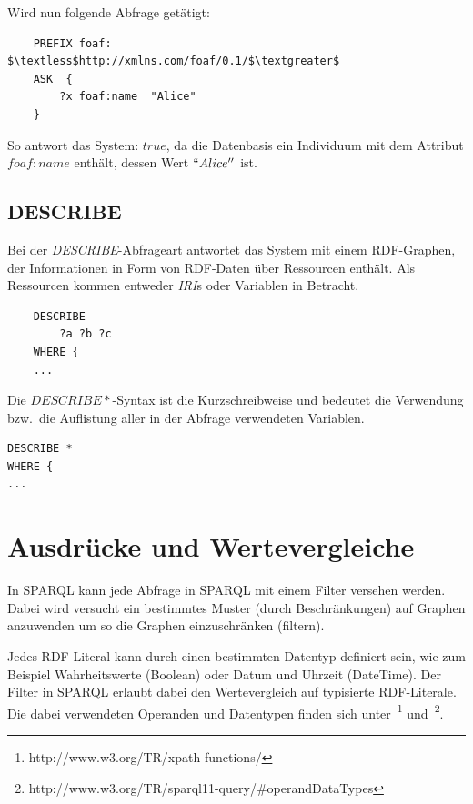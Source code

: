 Wird nun folgende Abfrage getätigt:
\lstset{language=XML}
\begin{lstlisting}
    PREFIX foaf:    $\textless$http://xmlns.com/foaf/0.1/$\textgreater$
    ASK  { 
        ?x foaf:name  "Alice"
    }
\end{lstlisting}
So antwort das System: $true$, da die Datenbasis ein Individuum mit dem Attribut $foaf:name$ enthält, dessen Wert $``Alice''$ ist.

\subsection{DESCRIBE}
\label{subsec:sparql_abfragearten_describe}
Bei der \textit{DESCRIBE}-Abfrageart antwortet das System mit einem RDF-Graphen, der Informationen in Form von RDF-Daten über Ressourcen enthält. Als Ressourcen kommen entweder \textit{IRI}s oder Variablen in Betracht.

\begin{lstlisting}
    DESCRIBE
        ?a ?b ?c
    WHERE {
    ...
\end{lstlisting}

Die $ DESCRIBE * $-Syntax ist die Kurzschreibweise und bedeutet die Verwendung bzw.\ die Auflistung aller in der Abfrage verwendeten Variablen.
\begin{lstlisting}
DESCRIBE *
WHERE {
...
\end{lstlisting}

\section{Ausdrücke und Wertevergleiche}
\label{sec:sparql_ausdruecke}
In SPARQL kann jede Abfrage in SPARQL mit einem Filter versehen werden. Dabei wird versucht ein bestimmtes Muster (durch Beschränkungen) auf Graphen anzuwenden um so die Graphen einzuschränken (filtern).

Jedes RDF-Literal kann durch einen bestimmten Datentyp definiert sein, wie zum Beispiel Wahrheitswerte (Boolean) oder Datum und Uhrzeit (DateTime). Der Filter in SPARQL erlaubt dabei den Wertevergleich auf typisierte RDF-Literale. Die dabei verwendeten Operanden und Datentypen finden sich unter~\footnote{http://www.w3.org/TR/xpath-functions/} und~\footnote{http://www.w3.org/TR/sparql11-query/\#operandDataTypes}.

